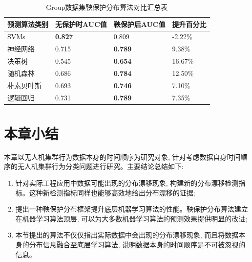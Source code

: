 \begin{table}[]
\centering
\caption{Group数据集鞅保护分布算法对比汇总表}
\label{tab:group}
\begin{tabular}{@{}llll@{}}
\toprule
预测算法类别 & 无保护时AUC值 & 鞅保护后AUC值 & 提升百分比\\ \midrule
SVMs                 & \textbf{0.827}        & 0.809               & {-2.22\%}\\
神经网络      & 0.715                 & \textbf{0.789}      & {9.38\%}\\
决策树       & 0.545                 & \textbf{0.654}      & {16.67\%}\\
随机森林        & 0.686                 & \textbf{0.784}      & {12.50\%}\\
朴素贝叶斯     & 0.693                 & \textbf{0.746}      & {7.10\%}\\
逻辑回归  & 0.731                 & \textbf{0.789}      & {7.35\%}\\ \bottomrule
\end{tabular}
\end{table}
 
\section{本章小结}
\label{conclusion}
本章以无人机集群行为数据本身的时间顺序为研究对象, 针对考虑数据自身时间顺序的无人机集群行为分类问题进行研究。主要结论总结如下:
\begin{enumerate}
\item 针对实际工程应用中数据可能出现的分布漂移现象, 构建新的分布漂移检测指标。这种新检测指标同样也能够高效地给出分布漂移的证据;
\item 提出一种鞅保护分布框架提升底层机器学习算法的性能。鞅保护分布算法建立在机器学习算法顶层, 可以为大多数机器学习算法的预测效果提供明显的改进;
\item 本节提出的算法不仅仅指出实际数据中会出现的分布漂移现象, 而且将数据本身的分布信息融合至底层学习算法, 说明数据本身的时间顺序是不可被忽视的信息。
\end{enumerate}